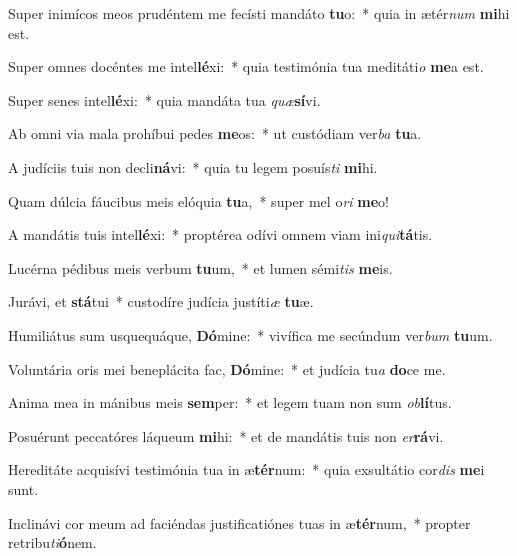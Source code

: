 \item Super inimícos meos prudéntem me fecísti mandáto \textbf{tu}o:~* quia in ætér\textit{num} \textbf{mi}hi est.
\item Super omnes docéntes me intel\textbf{lé}xi:~* quia testimónia tua meditáti\textit{o} \textbf{me}a est.
\item Super senes intel\textbf{lé}xi:~* quia mandáta tua \textit{quæ}\textbf{sí}vi.
\item Ab omni via mala prohíbui pedes \textbf{me}os:~* ut custódiam ver\textit{ba} \textbf{tu}a.
\item A judíciis tuis non decli\textbf{ná}vi:~* quia tu legem posuís\textit{ti} \textbf{mi}hi.
\item Quam dúlcia fáucibus meis elóquia \textbf{tu}a,~* super mel o\textit{ri} \textbf{me}o!
\item A mandátis tuis intel\textbf{lé}xi:~* proptérea odívi omnem viam ini\textit{qui}\textbf{tá}tis.
\item Lucérna pédibus meis verbum \textbf{tu}um,~* et lumen sémi\textit{tis} \textbf{me}is.
\item Jurávi, et \textbf{stá}tui~* custodíre judícia justíti\textit{æ} \textbf{tu}æ.
\item Humiliátus sum usquequáque, \textbf{Dó}mine:~* vivífica me secúndum ver\textit{bum} \textbf{tu}um.
\item Voluntária oris mei beneplácita fac, \textbf{Dó}mine:~* et judícia tu\textit{a} \textbf{do}ce me.
\item Anima mea in mánibus meis \textbf{sem}per:~* et legem tuam non sum \textit{ob}\textbf{lí}tus.
\item Posuérunt peccatóres láqueum \textbf{mi}hi:~* et de mandátis tuis non \textit{er}\textbf{rá}vi.
\item Hereditáte acquisívi testimónia tua in æ\textbf{tér}num:~* quia exsultátio cor\textit{dis} \textbf{me}i sunt.
\item Inclinávi cor meum ad faciéndas justificatiónes tuas in æ\textbf{tér}num,~* propter retribu\textit{ti}\textbf{ó}nem.
